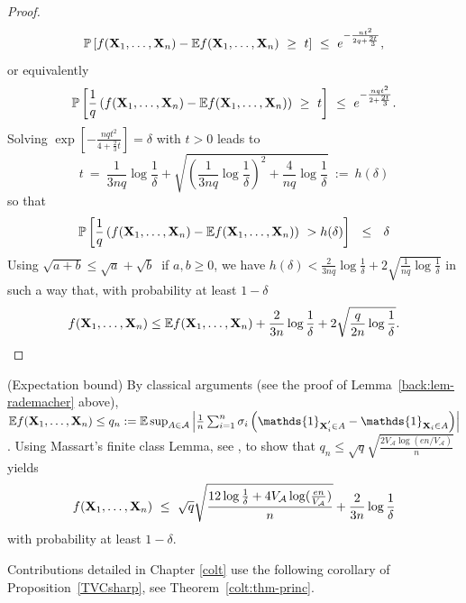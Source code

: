 \begin{proof}
$$\mathbb{P}\left [ f(\mathbf X_1,\ldots,\mathbf X_n) - \mathbb{E} f(\mathbf X_1,\ldots,\mathbf X_n) ~\ge~ t \right] ~\le~ e^{-\frac{n t^2}{2q + \frac{2t}{3}} },$$
or equivalently
$$\mathbb{P}\left [ \frac{1}{q} \left(f(\mathbf X_1,\ldots,\mathbf X_n) - \mathbb{E} f(\mathbf X_1,\ldots,\mathbf X_n)\right) ~\ge~ t \right] ~\le~ e^{-\frac{n qt^2}{2 + \frac{2t}{3}} }.$$
Solving $ \exp \left [ - \frac{nq t^2}{4  + \frac{2}{3} t}\right]=\delta$ with $t > 0$ leads to $$t ~=~ \frac{1}{3nq} \log \frac{1}{\delta} + \sqrt{\left ( \frac{1}{3nq} \log \frac{1}{\delta}\right)^{2} + \frac{4}{nq} \log \frac{1}{\delta} } ~:=~h(\delta)$$ so that
\begin{align*}
\mathbb{P} \left [ \frac{1}{q} \left(f(\mathbf X_1,\ldots,\mathbf X_n) - \mathbb{E} f(\mathbf X_1,\ldots,\mathbf X_n)\right)  ~> h(\delta) \right] ~~\le~~ \delta
\end{align*}
\noindent
Using $\sqrt{a+b} \le \sqrt a + \sqrt b~$ if $a,b \ge 0$, we have $h(\delta) < \frac{2}{3nq} \log \frac{1}{\delta} + 2 \sqrt{\frac{1}{nq} \log \frac{1}{\delta}} $ in such a way that, with probability at least $1-\delta$
\begin{align*}
f(\mathbf X_1,\ldots,\mathbf X_n) \le \mathbb{E}f(\mathbf X_1,\ldots,\mathbf X_n) + \frac{2}{3n} \log{\frac{1}{\delta}} + 2\sqrt{\frac{q}{2n} \log{\frac{1}{\delta}}}.
\end{align*}  
\end{proof}
%
\begin{remark}({\sc Expectation bound})
By classical arguments (see the proof of Lemma~\ref{back:lem-rademacher} above), $\mathbb{E}f(\mb X_1,\ldots,\mb X_n) \le q_n := \mathbb{E} \sup_{A \in \mathcal{A}} \left |\frac{1}{n} \sum_{i=1}^{n} \sigma_i \left ( \mathds{1}_{\mb X_i^{'} \in A} - \mathds{1}_{\mb X_i \in A} \right) \right|$. Using Massart's finite class Lemma, see \cite{Massart2000}, to show that $q_n \le \sqrt{q} \sqrt{\frac{2 V_\mathcal{A} \log(en/V_\mathcal{A})}{n}}$ yields
\begin{align*}
f(\mathbf X_1,\ldots,\mathbf X_n) ~\le~ \sqrt{q} \sqrt{\frac{12 \log\frac{1}{\delta} + 4 V_\mathcal{A} \log(\frac{en}{V_\mathcal{A}})}{n}} + \frac{2}{3n} \log\frac{1}{\delta}
\end{align*}
with probability at least $1-\delta$.
\end{remark}
%
Contributions detailed in Chapter \ref{colt} use the following corollary of
Proposition~\ref{TVCsharp}, see Theorem~\ref{colt:thm-princ}.

